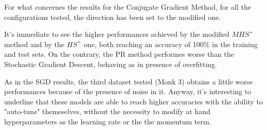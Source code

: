         For what concernes the results for the Conjugate Gradient Method, for all the configurations tested, the direction has been set to the modified one.%

        It's immediate to see the higher performances achieved by the modified $MHS^+$ method and by the $HS^+$ one, both reaching an accuracy of 100\% in the training and test sets. On the contrary, the PR method performes worse than the Stochastic Gradient Descent, behaving as in presence of overfitting. 

        As in the SGD results, the third dataset tested (Monk 3) obtains a little worse performances because of the presence of noise in it.
        Anyway, it's interesting to underline that these models are able to reach higher accuracies with the ability to "auto-tune" themeselves,  without the necessity to modify at hand hyperparameters as the learning rate or the the momentum term. 




